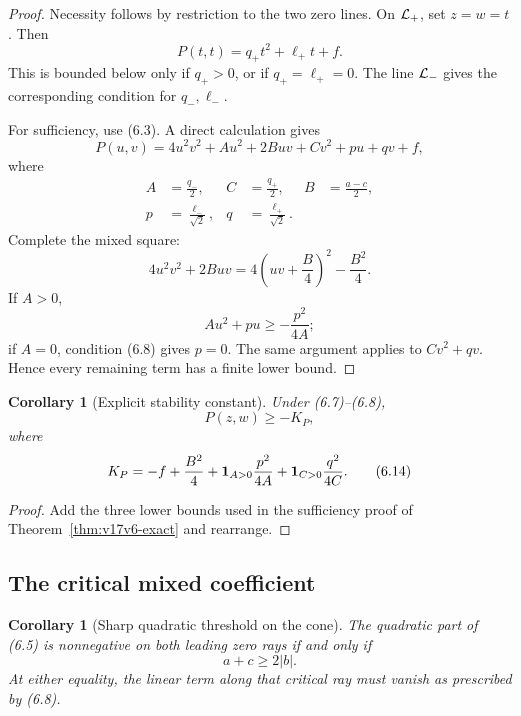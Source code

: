 \documentclass[11pt]{article}
\newtheorem{corollary}[theorem]{Corollary}
\theoremstyle{remark}
\begin{document}
\begin{proof}
Necessity follows by restriction to the two zero lines.  On
\({\cal L}_+\), set \(z=w=t\).  Then
\[
 P(t,t)=q_+t^2+\ell_+t+f.                           \tag{6.9}
\]
This is bounded below only if \(q_+>0\), or if
\(q_+=\ell_+=0\).  The line \({\cal L}_-\) gives the corresponding
condition for \(q_-,\ell_-\).

For sufficiency, use (6.3).  A direct calculation gives
\[
 P(u,v)
 =
 4u^2v^2+Au^2+2Buv+Cv^2+pu+qv+f,                  \tag{6.10}
\]
where
\[
\begin{split}
 A&=\frac{q_-}{2},&
 C&=\frac{q_+}{2},&
 B&=\frac{a-c}{2},\\
 p&=\frac{\ell_-}{\sqrt2},&
 q&=\frac{\ell_+}{\sqrt2}.                         \tag{6.11}
\end{split}
\]
Complete the mixed square:
\[
 4u^2v^2+2Buv
 =
 4\left(uv+\frac B4\right)^2-\frac{B^2}{4}.
                                                               \tag{6.12}
\]
If \(A>0\),
\[
 Au^2+pu\geq-\frac{p^2}{4A};
\]
if \(A=0\), condition (6.8) gives \(p=0\).  The same argument applies
to \(Cv^2+qv\).  Hence every remaining term has a finite lower bound.
\end{proof}

\begin{corollary}[Explicit stability constant]
\label{cor:v17v6-floor}
Under (6.7)--(6.8),
\[
 P(z,w)\geq-K_P,                                   \tag{6.13}
\]
where
\[
 K_P=
 -f+\frac{B^2}{4}
 +{\bf1}_{A>0}\frac{p^2}{4A}
 +{\bf1}_{C>0}\frac{q^2}{4C}.                      \tag{6.14}
\]
\end{corollary}

\begin{proof}
Add the three lower bounds used in the sufficiency proof of
Theorem~\ref{thm:v17v6-exact} and rearrange.
\end{proof}

\subsection{The critical mixed coefficient}

\begin{corollary}[Sharp quadratic threshold on the cone]
\label{cor:v17v6-threshold}
The quadratic part of (6.5) is nonnegative on both leading zero rays
if and only if
\[
 a+c\geq2|b|.                                      \tag{6.15}
\]
At either equality, the linear term along that critical ray must
vanish as prescribed by (6.8).
\end{corollary}
\end{document}
